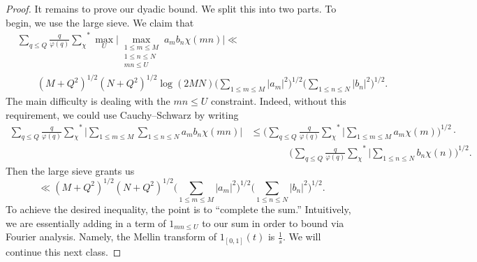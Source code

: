 \documentclass[../notes.tex]{subfiles}
\begin{document}
\begin{proof}
	It remains to prove our dyadic bound. We split this into two parts. To begin, we use the large sieve. We claim that
	\begin{align*}
		&\sum_{q\le Q}\frac q{\varphi(q)}{\sum_\chi}^*\max_U\bigg|\max_{\substack{1\le m\le M\\1\le n\le N\\mn\le U}}a_mb_n\chi(mn)\bigg| \ll \\
		&\qquad\left(M+Q^2\right)^{1/2}\left(N+Q^2\right)^{1/2}\log(2MN)\Bigg(\sum_{1\le m\le M}|a_m|^2\Bigg)^{1/2}\Bigg(\sum_{1\le n\le N}|b_n|^2\Bigg)^{1/2}.
	\end{align*}
	The main difficulty is dealing with the $mn\le U$ constraint. Indeed, without this requirement, we could use Cauchy--Schwarz by writing
	\begin{align*}
		\sum_{q\le Q}\frac q{\varphi(q)}{\sum_\chi}^*\Bigg|\sum_{1\le m\le M}\sum_{1\le n\le N}a_mb_n\chi(mn)\Bigg| &\le \Bigg(\sum_{q\le Q}\frac q{\varphi(q)}{\sum_\chi}^*\Bigg|\sum_{1\le m\le M}a_m\chi(m)\Bigg)^{1/2}\cdot \\
		&\qquad\qquad\Bigg(\sum_{q\le Q}\frac q{\varphi(q)}{\sum_\chi}^*\Bigg|\sum_{1\le n\le N}b_n\chi(n)\Bigg)^{1/2}.
	\end{align*}
	Then the large sieve grants us
	\[\ll\left(M+Q^2\right)^{1/2}\left(N+Q^2\right)^{1/2}\Bigg(\sum_{1\le m\le M}|a_m|^2\Bigg)^{1/2}\Bigg(\sum_{1\le n\le N}|b_n|^2\Bigg)^{1/2}.\]
	To achieve the desired inequality, the point is to ``complete the sum.'' Intuitively, we are essentially adding in a term of $1_{mn\le U}$ to our sum in order to bound via Fourier analysis. Namely, the Mellin transform of $1_{[0,1]}(t)$ is $\frac1s$. We will continue this next class.
\end{proof}
\end{document}
